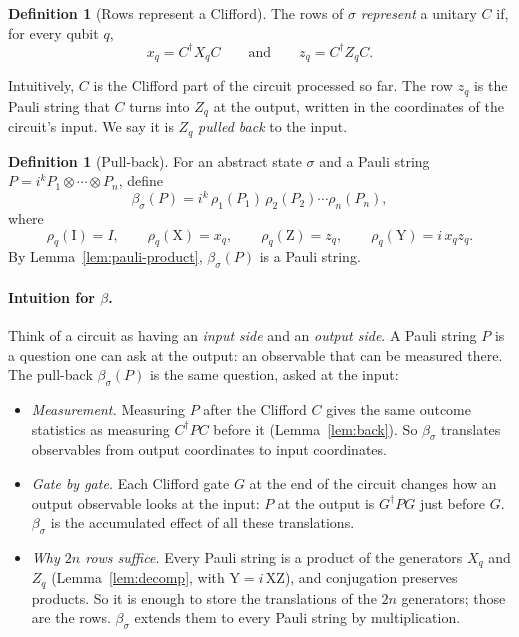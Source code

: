 \documentclass[11pt]{article}
\theoremstyle{definition}
\newtheorem{definition}[theorem]{Definition}
\theoremstyle{remark}
\newcommand{\adj}{^{\dagger}}
\newcommand{\back}{\beta}
\newcommand{\tI}{\mathrm{I}}
\newcommand{\tX}{\mathrm{X}}
\newcommand{\tY}{\mathrm{Y}}
\newcommand{\tZ}{\mathrm{Z}}
\begin{document}
\begin{definition}[Rows represent a Clifford]
The rows of $\sigma$ \emph{represent} a unitary $C$ if, for every qubit $q$,
\[
  x_q = C\adj X_q C \qquad\text{and}\qquad z_q = C\adj Z_q C .
\]
\end{definition}

Intuitively, $C$ is the Clifford part of the circuit processed so far. The row $z_q$ is
the Pauli string that $C$ turns into $Z_q$ at the output, written in the coordinates of the
circuit's input. We say it is $Z_q$ \emph{pulled back} to the input.

\begin{definition}[Pull-back]\label{def:back}
For an abstract state $\sigma$ and a Pauli string $P = i^k P_1 \otimes \cdots \otimes P_n$,
define
\[
  \back_\sigma(P) = i^k\, \rho_1(P_1)\, \rho_2(P_2) \cdots \rho_n(P_n),
\]
where
\[
  \rho_q(\tI) = I,\qquad \rho_q(\tX) = x_q,\qquad \rho_q(\tZ) = z_q,\qquad \rho_q(\tY) = i\, x_q z_q .
\]
By Lemma~\ref{lem:pauli-product}, $\back_\sigma(P)$ is a Pauli string.
\end{definition}

\paragraph{Intuition for $\back$.}
Think of a circuit as having an \emph{input side} and an \emph{output side}. A Pauli string
$P$ is a question one can ask at the output: an observable that can be measured there. The
pull-back $\back_\sigma(P)$ is the same question, asked at the input:
\begin{itemize}[nosep]
  \item \emph{Measurement.} Measuring $P$ after the Clifford $C$ gives the same outcome
  statistics as measuring $C\adj P C$ before it (Lemma~\ref{lem:back}). So $\back_\sigma$
  translates observables from output coordinates to input coordinates.
  \item \emph{Gate by gate.} Each Clifford gate $G$ at the end of the circuit changes how an
  output observable looks at the input: $P$ at the output is $G\adj P G$ just before $G$.
  $\back_\sigma$ is the accumulated effect of all these translations.
  \item \emph{Why $2n$ rows suffice.} Every Pauli string is a product of the generators $X_q$
  and $Z_q$ (Lemma~\ref{lem:decomp}, with $\tY = i\,\tX\tZ$), and conjugation preserves
  products. So it is enough to store the translations of the $2n$ generators; those are the
  rows. $\back_\sigma$ extends them to every Pauli string by multiplication.
\end{itemize}
\end{document}

